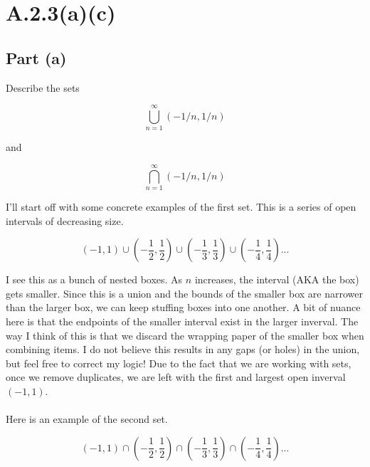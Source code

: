 \documentclass{article}
\begin{document}
\section{A.2.3(a)(c)}

\subsection{Part (a)}

Describe the sets

\begin{equation}
	\bigcup_{n=1}^{\infty}(-1/n,1/n)
\end{equation}

and

\begin{equation}
	\bigcap_{n=1}^{\infty}(-1/n,1/n)
\end{equation}

I'll start off with some concrete examples of the first set.
This is a series of open intervals of decreasing size.

\begin{equation}
	(-1,1) \cup (-\frac{1}{2},\frac{1}{2})\cup (-\frac{1}{3},\frac{1}{3})\cup (-\frac{1}{4},\frac{1}{4}) ...
\end{equation}

I see this as a bunch of nested boxes.
As $n$ increases, the interval (AKA the box) gets smaller.
Since this is a union and the bounds of the smaller box are narrower than the larger box, we can keep stuffing boxes into one another.
A bit of nuance here is that the endpoints of the smaller interval exist in the larger inverval.
The way I think of this is that we discard the wrapping paper of the smaller box when combining items.
I do not believe this results in any gaps (or holes) in the union, but feel free to correct my logic!
Due to the fact that we are working with sets, once we remove duplicates, we are left with the first and largest open inverval $(-1,1)$.

\paragraph{}

Here is an example of the second set.

\begin{equation}
	(-1,1) \cap (-\frac{1}{2},\frac{1}{2})\cap (-\frac{1}{3},\frac{1}{3})\cap (-\frac{1}{4},\frac{1}{4}) ...
\end{equation}
\end{document}
